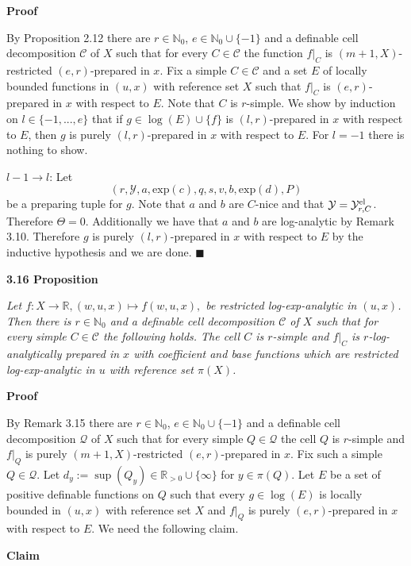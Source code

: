 \documentclass[12pt]{article}
\def\vs{\vspace}
\def\exp{\mathrm{exp}}
\begin{document}
\vs{0.4cm}
{\bf Proof}

\vs{0.1cm}
By Proposition 2.12 there are $r \in \mathbb{N}_0$, $e \in \mathbb{N}_0 \cup \{-1\}$ and a definable cell decomposition $\mathcal{C}$ of $X$ such that for every $C \in \mathcal{C}$ the function $f|_C$ is $(m+1,X)$-restricted $(e,r)$-prepared in $x$. Fix a simple $C \in \mathcal{C}$ and a set $E$ of locally bounded functions in $(u,x)$ with reference set $X$ such that $f|_C$ is $(e,r)$-prepared in $x$ with respect to $E$. Note that $C$ is $r$-simple. We show by induction on $l \in \{-1,...,e\}$ that if $g \in \log(E) \cup \{f\}$ is $(l,r)$-prepared in $x$ with respect to $E$, then $g$ is purely $(l,r)$-prepared in $x$ with respect to $E$. For $l=-1$ there is nothing to show. 

\vs{0.2cm}
$l-1 \to l$: Let 
$$(r,\mathcal{Y},a,\exp(c),q,s,v,b,\exp(d),P)$$
be a preparing tuple for $g$. Note that $a$ and $b$ are $C$-nice and that $\mathcal{Y}=\mathcal{Y}_{r,C}^{\textnormal{el}}$. Therefore $\Theta=0$. Additionally we have that $a$ and $b$ are log-analytic by Remark 3.10. Therefore $g$ is purely $(l,r)$-prepared in $x$ with respect to $E$ by the inductive hypothesis and we are done.
\hfill$\blacksquare$

\vs{0.5cm}
{\bf3.16 Proposition}

\vs{0.1cm}
{\it 
Let $f:X \to \mathbb{R}, (w,u,x) \mapsto f(w,u,x),$ be restricted log-exp-analytic in $(u,x)$. Then there is $r \in \mathbb{N}_0$ and a definable cell decomposition $\mathcal{C}$ of $X$ such that for every simple $C \in \mathcal{C}$ the following holds. The cell $C$ is $r$-simple and $f|_C$ is $r$-log-analytically prepared in $x$ with coefficient and base functions which are restricted log-exp-analytic in $u$ with reference set $\pi(X)$.}

\vs{0.4cm}
{\bf Proof}

\vs{0.1cm}
By Remark 3.15 there are $r \in \mathbb{N}_0$, $e \in \mathbb{N}_0 \cup \{-1\}$ and a definable cell decomposition $\mathcal{Q}$ of $X$ such that for every simple $Q \in \mathcal{Q}$ the cell $Q$ is $r$-simple and $f|_Q$ is purely $(m+1,X)$-restricted $(e,r)$-prepared in $x$. Fix such a simple $Q \in \mathcal{Q}$. Let $d_y:=\sup(Q_y) \in \mathbb{R}_{>0} \cup \{\infty\}$ for $y \in \pi(Q)$. Let $E$ be a set of positive definable functions on $Q$ such that every $g \in \log(E)$ is locally bounded in $(u,x)$ with reference set $X$ and $f|_Q$ is purely $(e,r)$-prepared in $x$ with respect to $E$. We need the following claim.

\vs{0.4cm}
{\bf Claim}
\end{document}
